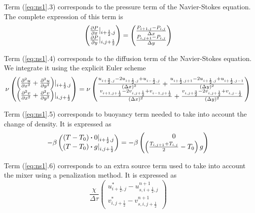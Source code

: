 \documentclass[a4paper,10pt]{scrartcl}
\begin{document}
Term (\ref{eq:ns1}.3) corresponds to the pressure term of the Navier-Stokes equation. The complete expression of this term is
\begin{equation} \begin{pmatrix} \pdv{P}{x}\rvert_{i+\frac{1}{2},j} \\ \pdv{P}{y}\rvert_{i,j+\frac{1}{2}} \end{pmatrix}  = \begin{pmatrix} \frac{P_{i+1,j}-P_{i,j}}{\Delta x} \\ \frac{P_{i,j+1} - P_{i,j}}{\Delta y} \end{pmatrix}\end{equation}

Term (\ref{eq:ns1}.4) corresponds to the diffusion term of the Navier-Stokes equation. We integrate it using the explicit Euler scheme
\begin{equation} \nu\begin{pmatrix} \left(\pdv[2]{u}{x} + \pdv[2]{u}{y}\right)\rvert_{i+\frac{1}{2},j} \\ \left(\pdv[2]{v}{x} + \pdv[2]{v}{y}\right)\rvert_{i,j+\frac{1}{2}} \end{pmatrix} = \nu\begin{pmatrix} \frac{u_{i+\frac{3}{2},j}-2u_{i+\frac{1}{2},j}+u_{i-\frac{1}{2},j}}{(\Delta x)^2} + \frac{u_{i+\frac{1}{2},j+1}-2u_{i+\frac{1}{2},j}+u_{i+\frac{1}{2},j-1}}{(\Delta y)^2} \\ \frac{v_{i+1,j+\frac{1}{2}}-2v_{i,j+\frac{1}{2}}+v_{i-1,j+\frac{1}{2}}}{(\Delta x)^2} + \frac{v_{i,j+\frac{3}{2}}-2v_{i,j+\frac{1}{2}}+v_{i,j-\frac{1}{2}}}{(\Delta y)^2} \end{pmatrix}\end{equation}

Term (\ref{eq:ns1}.5) corresponds to buoyancy term needed to take into account the change of density. It is expressed as 
\begin{equation} -\beta\begin{pmatrix} (T-T_0)\vdot 0\rvert_{i+\frac{1}{2},j} \\ (T-T_0)\vdot g\rvert_{i,j+\frac{1}{2}} \end{pmatrix}  = -\beta\begin{pmatrix} 0 \\ \left(\frac{T_{i,j+1}+T_{i,j}}{2} - T_0\right)g \end{pmatrix}\end{equation} 

Term (\ref{eq:ns1}.6) corresponds to an extra source term used to take into account the mixer using a penalization method. It is expressed as
\begin{equation} \frac{\chi}{\Delta\tau}\begin{pmatrix} u^*_{i+\frac{1}{2},j} - u^{n+1}_{s,i+\frac{1}{2},j} \\ v^*_{i,j+\frac{1}{2}} - v^{n+1}_{s,i,j+\frac{1}{2}} \end{pmatrix} \end{equation}
\end{document}
